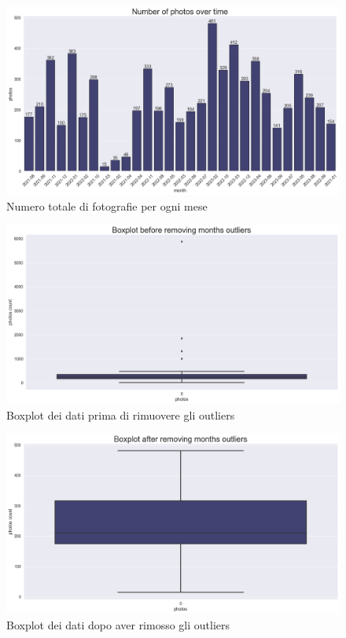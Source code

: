\documentclass[12pt,a4paper,twoside]{article}
\begin{document}
\begin{figure}[h!]
    \centering
    \includegraphics[width=\textwidth ,height=\textheight, keepaspectratio]{assets/photos-ot.png}
    \caption{Numero totale di fotografie per ogni mese}
    \label{fig:photos-ot}
\end{figure}

\begin{figure}[h!]
    \centering
    \includegraphics[width=\textwidth ,height=\textheight, keepaspectratio]{assets/boxplot-outliers.png}
    \caption{Boxplot dei dati prima di rimuovere gli outliers}
    \label{fig:boxplot-outliers}
\end{figure}

\begin{figure}[h!]
    \centering
    \includegraphics[width=\textwidth ,height=\textheight, keepaspectratio]{assets/boxplot-wout-outliers.png}
    \caption{Boxplot dei dati dopo aver rimosso gli outliers}
    \label{fig:boxplot-wout-outliers}
\end{figure}
\end{document}
